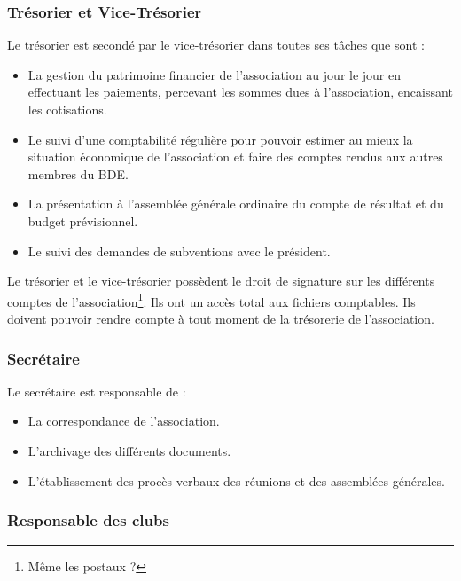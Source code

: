 \documentclass{article} %
\begin{document}
			\subsubsection{Trésorier et Vice-Trésorier}

				Le trésorier est secondé par le vice-trésorier dans toutes ses
				tâches que sont :
				\begin{itemize}
					\item La gestion du patrimoine financier de l’association au
						jour le jour en effectuant les paiements, percevant les
						sommes dues à l’association, encaissant les cotisations.
					\item Le suivi d’une comptabilité régulière pour pouvoir
						estimer au mieux la situation économique de
						l’association et faire des comptes rendus aux autres
						membres du BDE.
					\item La présentation à l’assemblée générale ordinaire du
						compte de résultat et du budget prévisionnel.
					\item Le suivi des demandes de subventions avec le
						président.
				\end{itemize}

				Le trésorier et le vice-trésorier possèdent le droit de
				signature sur les différents comptes de
				l'association\footnote{Même les postaux ?}. Ils ont un accès
				total aux fichiers comptables. Ils doivent pouvoir rendre compte
				à tout moment de la trésorerie de l’association.

			\subsubsection{Secrétaire}

				Le secrétaire est responsable de :
				\begin{itemize}
					\item La correspondance de l’association.
					\item L’archivage des différents documents.
					\item L’établissement des procès-verbaux des réunions et des
						assemblées générales.
				\end{itemize}

			\subsubsection{Responsable des clubs}
\end{document}
